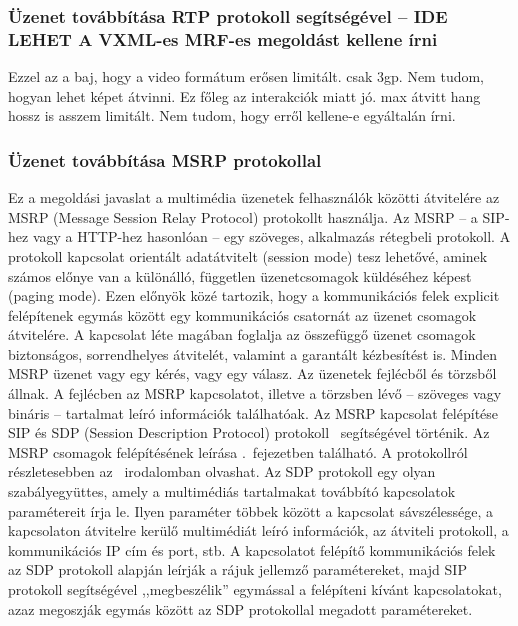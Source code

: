 \subsubsection{Üzenet továbbítása RTP protokoll segítségével -- {\color{red}IDE LEHET A VXML-es MRF-es megoldást kellene írni}}

{\color{red}Ezzel az a baj, hogy a video formátum erősen limitált. csak 3gp. Nem tudom, hogyan lehet képet átvinni. Ez főleg az interakciók miatt jó. max átvitt hang hossz is asszem limitált. Nem tudom, hogy erről kellene-e egyáltalán írni.}


\subsubsection{Üzenet továbbítása MSRP protokollal}
\label{sec:msrp_message}

Ez a megoldási javaslat a multimédia üzenetek felhasználók közötti átvitelére az MSRP (Message Session Relay Protocol) protokollt használja. Az MSRP -- a SIP-hez vagy a HTTP-hez hasonlóan -- egy szöveges, alkalmazás rétegbeli protokoll. A protokoll kapcsolat orientált adatátvitelt (session mode) tesz lehetővé, aminek számos előnye van a különálló, független üzenetcsomagok küldéséhez képest (paging mode).
Ezen előnyök közé tartozik, hogy a kommunikációs felek explicit felépítenek egymás között egy kommunikációs csatornát az üzenet csomagok átvitelére. A kapcsolat léte magában foglalja az összefüggő üzenet csomagok biztonságos, sorrendhelyes átvitelét, valamint a garantált kézbesítést is. Minden MSRP üzenet vagy egy kérés, vagy egy válasz. Az üzenetek fejlécből és törzsből állnak. A fejlécben az MSRP kapcsolatot, illetve a törzsben lévő -- szöveges vagy bináris -- tartalmat leíró információk találhatóak. Az MSRP kapcsolat felépítése SIP és SDP (Session Description Protocol) protokoll~\cite{rfc4566} segítségével történik. Az MSRP csomagok felépítésének leírása .~fejezetben található. A protokollról részletesebben az~\cite{rfc4975} irodalomban olvashat. Az SDP protokoll egy olyan szabályegyüttes, amely a multimédiás tartalmakat továbbító kapcsolatok paramétereit írja le. Ilyen paraméter többek között a kapcsolat sávszélessége, a kapcsolaton átvitelre kerülő multimédiát leíró információk, az átviteli protokoll, a kommunikációs IP cím és port, stb. A kapcsolatot felépítő kommunikációs felek az SDP protokoll alapján leírják a rájuk jellemző paramétereket, majd SIP protokoll segítségével ,,megbeszélik'' egymással a felépíteni kívánt kapcsolatokat, azaz megoszják egymás között az SDP protokollal megadott paramétereket. 

